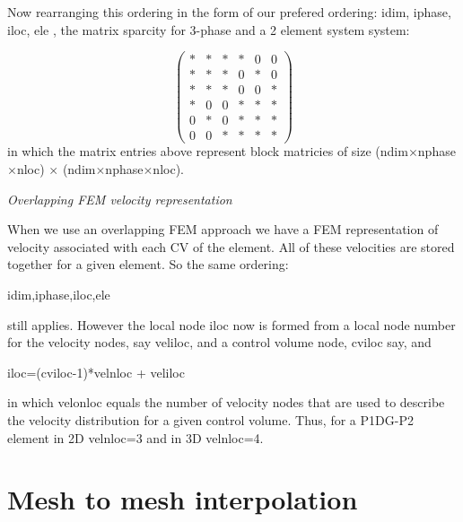 Now rearranging this ordering in the form of our prefered ordering: idim, iphase, iloc, ele
, 
the matrix sparcity for 3-phase and a 2 element system system:

\begin{equation}
  \begin{pmatrix}
*  &  *  &  *      &   *   &  0  &  0  \\ 
*  &  *  &  *      &   0   &  *  &  0  \\ 
*  &  *  &  *      &   0   &  0  &  *  \\ 
%
*  &  0  &  0      &   *   &  *  &  *  \\
0  &  *  &  0      &   *   &  *  &  *  \\
0  &  0  &  *      &   *   &  *  &  *  
  \end{pmatrix}
\label{Vel-Mphase-mat-spar}
\end{equation}
in which the matrix entries above represent block matricies of size (ndim$\times$nphase$\times$nloc) 
$\times$  (ndim$\times$nphase$\times$nloc).  


\par\noindent
{\it Overlapping FEM velocity representation} 
\par\noindent
When we use an overlapping FEM approach we have a FEM representation of 
velocity associated with each CV of the element. All of these velocities are stored 
together for a given element. So the same ordering: 
\par\noindent
idim,iphase,iloc,ele

\par\noindent
still applies. However the local node iloc now is formed from 
a local node number for the velocity nodes, say veliloc, and 
a control volume node, cviloc say, and  
\par\noindent
iloc=(cviloc-1)*velnloc + veliloc

\par\noindent
in which velonloc equals the number of velocity nodes that are used 
to describe the velocity distribution for a given control volume. 
Thus, for a P1DG-P2 element in 2D velnloc=3 and in 3D velnloc=4. 



\pagebreak



\section{Mesh to mesh interpolation}
\label{Mesh to mesh interpolation}

